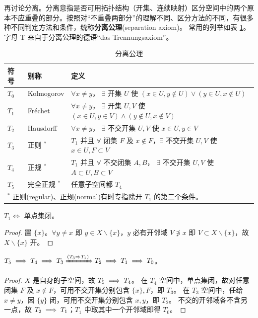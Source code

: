 再讨论分离。分离意指是否可用拓扑结构（开集、连续映射）区分空间中的两个原本不应重叠的部分。按照对“不重叠两部分”的理解不同、区分方法的不同，有很多种不同判定方法和条件，统称\textbf{分离公理}(separation axiom)。
常用的列举如表 \ref{tab:separation}。字母 T 来⾃于分离公理的德语“das Trennungsaxiom”。
\begin{table}[ht]
    \centering
    \caption{分离公理}
    \label{tab:separation}
    \begin{tabular}{lll}
        \toprule
        符号 & 别称 & 定义\\
        \midrule
        $T_0$ & Kolmogorov & $\forall x \ne y$， $\exists$ 开集 $U$ 使 $(x \in U, y \notin U)\lor (y \in U, x \notin U)$ \\
        $T_1$ & Fréchet & $\forall x \ne y$， $\exists$ 开集 $U, V$ 使 $(x \in U, y \in V)\land (y \notin U , x \notin V)$ \\
        $T_2$ & Hausdorff & $\forall x \ne y$， $\exists$ 不交开集 $U, V$ 使 $x \in U, y \in V$ \\
        $T_3$ & 正则 $^*$ & $T_1$ 并且 $\forall$ 闭集 $F$ 及 $x \notin F$，$\exists$ 不交开集 $U, V$ 使 $x \in U, F \subset V$ \\
        $T_4$ & 正规 $^*$ & $T_1$ 并且 $\forall$ 不交闭集 $A, B$， $\exists$ 不交开集 $U, V$ 使 $A \subset U, B \subset V$ \\
        $T_5$ & 完全正规 $^*$ & 任意子空间都 $T_4$ \\
        \bottomrule
        \multicolumn{3}{l}{\small $^*$ 正则(regular)、正规(normal)有时专指除开 $T_1$ 的第二个条件。}
    \end{tabular}
\end{table}

\begin{theorem}
    $T_1\iff$ 单点集闭。
\end{theorem}
\begin{proof}
    置 $\{x\}$。$\forall y\ne x$ 即 $y\in X\backslash\{x\}$，$y$ 必有开邻域 $V\notni x$ 即 $V\subset X\backslash\{x\}$，故 $X\backslash\{x\}$ 开。
\end{proof}

\begin{theorem}
    $T_5\implies T_4\implies T_3\xRightarrow{(T_3\Rightarrow T_1)}T_2 \implies T_1\implies T_0$。
\end{theorem}

\begin{proof}
    $X$ 是自身的子空间，故 $T_5\implies T_4$。
    在 $T_4$ 空间中，单点集闭，故对任意闭集 $F$ 及 $x\notin F$，可用不交开集分别包含 $\{x\},F$，即 $T_3$。
    在 $T_3$ 空间中，任给 $x\ne y$，因 $\{y\}$ 闭，可用不交开集分别包含 $x,y$，即 $T_2$。
    不交的开邻域各不含另一点，故 $T_2\implies T_1$；$T_1$ 中取其中一个开邻域即得 $T_0$。
\end{proof}

